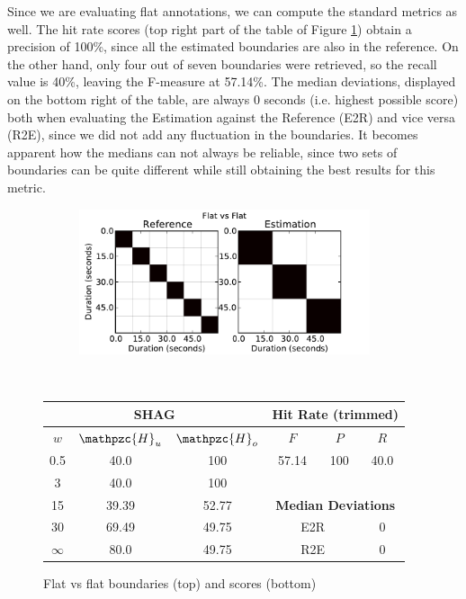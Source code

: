 \documentclass{article}
\begin{document}
Since we are evaluating flat annotations, we can compute the standard metrics as well. The hit rate scores (top right part of the table of Figure \ref{fig:flat-flat}) obtain a precision of 100\%, since all the estimated boundaries are also in the reference.
On the other hand, only four out of seven boundaries were retrieved, so the recall value is 40\%, leaving the F-measure at 57.14\%.
The median deviations, displayed on the bottom right of the table, are always 0 seconds (i.e. highest possible score) both when evaluating the Estimation against the Reference (E2R) and vice versa (R2E), since we did not add any fluctuation in the boundaries.
It becomes apparent how the medians can not always be reliable, since two sets of boundaries can be quite different while still obtaining the best results for this metric.

\begin{figure}
  \centering
  \begin{subfigure}{0.5\textwidth}
    \centering
    \includegraphics[width=0.94\textwidth]{plots/flat-flat.pdf}
  \end{subfigure}%
  \\
  \begin{minipage}{0.5\textwidth}
    \centering
    \vspace{10pt}
    \begin{tabular}{|c|c|c||c|c|c|}
      \hline
      \multicolumn{3}{|c||}{\textbf{SHAG}} & \multicolumn{3}{c|}{\textbf{Hit Rate (trimmed)}} \\
      \hline
      $w$ & $\mathpzc{H}_u$   & $\mathpzc{H}_o$ & $F$     & $P$     & $R$ \\
      \hline
      0.5       & 40.0   & 100   & 57.14  & 100 & 40.0 \\
      \cline{4-6}
      3         & 40.0   & 100  \\
      \cline{4-6}
      15        & 39.39  & 52.77 & \multicolumn{3}{c|}{\textbf{Median Deviations}}   \\
      \cline{4-6}
      30        & 69.49  & 49.75 & \multicolumn{2}{c|}{E2R} & 0 \\
      $\infty$  & 80.0   & 49.75 & \multicolumn{2}{c|}{R2E} & 0 \\  
      \hline
    \end{tabular}
  \end{minipage}
  \caption{Flat vs flat boundaries (top) and scores (bottom)}
  \label{fig:flat-flat}
\end{figure}
\end{document}
